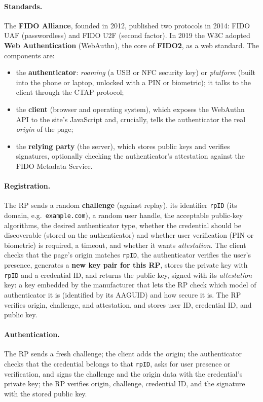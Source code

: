 \paragraph{Standards.} The \textbf{FIDO Alliance}, founded in 2012, published two protocols in 2014: FIDO UAF (passwordless) and FIDO U2F (second factor). In 2019 the W3C adopted \textbf{Web Authentication} (WebAuthn), the core of \textbf{FIDO2}, as a web standard. The components are:
\begin{itemize}
    \item the \textbf{authenticator}: \emph{roaming} (a USB or NFC security key) or \emph{platform} (built into the phone or laptop, unlocked with a PIN or biometric); it talks to the client through the CTAP protocol;
    \item the \textbf{client} (browser and operating system), which exposes the WebAuthn API to the site's JavaScript and, crucially, tells the authenticator the real \emph{origin} of the page;
    \item the \textbf{relying party} (the server), which stores public keys and verifies signatures, optionally checking the authenticator's attestation against the FIDO Metadata Service.
\end{itemize}

\paragraph{Registration.} The RP sends a random \textbf{challenge} (against replay), its identifier \texttt{rpID} (its domain, e.g.\ \texttt{example.com}), a random user handle, the acceptable public-key algorithms, the desired authenticator type, whether the credential should be discoverable (stored on the authenticator) and whether user verification (PIN or biometric) is required, a timeout, and whether it wants \emph{attestation}. The client checks that the page's origin matches \texttt{rpID}, the authenticator verifies the user's presence, generates a \textbf{new key pair for this RP}, stores the private key with \texttt{rpID} and a credential ID, and returns the public key, signed with its \emph{attestation} key: a key embedded by the manufacturer that lets the RP check which model of authenticator it is (identified by its AAGUID) and how secure it is. The RP verifies origin, challenge, and attestation, and stores user ID, credential ID, and public key.

\paragraph{Authentication.} The RP sends a fresh challenge; the client adds the origin; the authenticator checks that the credential belongs to that \texttt{rpID}, asks for user presence or verification, and signs the challenge and the origin data with the credential's private key; the RP verifies origin, challenge, credential ID, and the signature with the stored public key.

